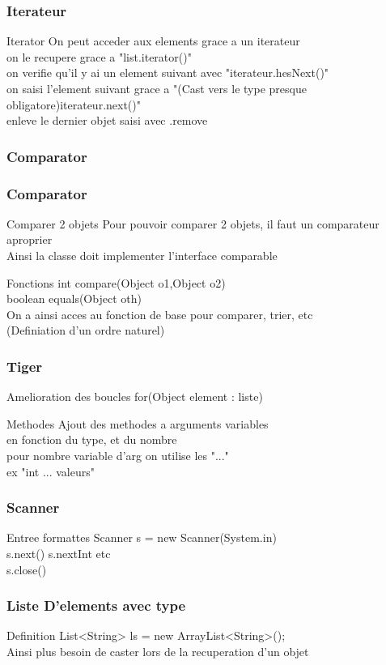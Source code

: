 \documentclass[12pt,a4paper,twoside]{beamer}
\begin{document}
\begin{frame}
\frametitle{Iterateur}
\begin{block}{Iterator}
On peut acceder aux elements grace a un iterateur\\
on le recupere grace a "list.iterator()"\\
on verifie qu'il y ai un element suivant avec "iterateur.hesNext()"\\
on saisi l'element suivant grace a "(Cast vers le type presque obligatore)iterateur.next()"\\
enleve le dernier objet saisi avec .remove\\
\end{block}
\end{frame}
\begin{frame}
\frametitle{Comparator}
\end{frame}
\begin{frame}
\frametitle{Comparator}
\begin{block}{Comparer 2 objets}
Pour pouvoir comparer 2 objets, il faut un comparateur aproprier\\
Ainsi la classe doit implementer l'interface comparable\\
\end{block}
\begin{block}{Fonctions}
int compare(Object o1,Object o2)\\
boolean equals(Object oth)\\
On a ainsi acces au fonction de base pour comparer, trier, etc\\
(Definiation d'un ordre naturel)\\
\end{block}
\end{frame}
\begin{frame}
\frametitle{Tiger}
\begin{block}{Amelioration des boucles}
for(Object element : liste){}\\
\end{block}
\begin{block}{Methodes}
Ajout des methodes a arguments variables\\
en fonction du type, et du nombre\\
pour nombre variable d'arg on utilise les "..."\\
ex "int ... valeurs"\\
\end{block}
\end{frame}
\begin{frame}
\frametitle{Scanner}
\begin{block}{Entree formattes}
Scanner s = new Scanner(System.in)\\
s.next()   s.nextInt etc\\
s.close()\\
\end{block}
\end{frame}
\begin{frame}
\frametitle{Liste D'elements avec type}
\begin{block}{Definition}
List<String> ls = new ArrayList<String>();\\
Ainsi plus besoin de caster lors de la recuperation d'un objet\\
\end{block}
\end{frame}
\end{document}

